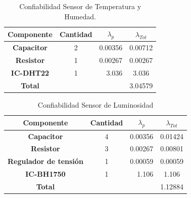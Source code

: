 \begin{table}[H]
\centering
\begin{tabular}{|c|crc|}
\hline
\textbf{Componente} & \multicolumn{1}{c|}{\textbf{Cantidad}} & \multicolumn{1}{c|}{\textbf{$\lambda_p$}}            & \textbf{$\lambda_{Tot}$}   \\ \hline
\textbf{Capacitor}  & \multicolumn{1}{c|}{2}                 & \multicolumn{1}{r|}{0.00356}                         & 0.00712                      \\ \hline
\textbf{Resistor}   & \multicolumn{1}{c|}{1}                 & \multicolumn{1}{r|}{\cellcolor[HTML]{FFFFFF}0.00267} & 0.00267                      \\ \hline
\textbf{IC-DHT22}   & \multicolumn{1}{c|}{1}                 & \multicolumn{1}{r|}{\cellcolor[HTML]{FFFFFF}3.036}   & 3.036                        \\ \hline
\textbf{Total}      & \multicolumn{1}{l}{}                   & \multicolumn{1}{l}{}                                 & \multicolumn{1}{r|}{3.04579} \\ \hline
\end{tabular}
\caption{Confiabilidad Sensor de Temperatura y Humedad.}
\label{tab:conftemphum}
\end{table}
\begin{table}[H]
\centering
\begin{tabular}{|c|crc|}
\hline
\textbf{Componente}           & \multicolumn{1}{c|}{\textbf{Cantidad}} & \multicolumn{1}{c|}{\textbf{$\lambda_p$}}            & \textbf{$\lambda_{Tot}$}   \\ \hline
\textbf{Capacitor}            & \multicolumn{1}{c|}{4}                 & \multicolumn{1}{r|}{0.00356}                         & 0.01424                      \\ \hline
\textbf{Resistor}             & \multicolumn{1}{c|}{3}                 & \multicolumn{1}{r|}{\cellcolor[HTML]{FFFFFF}0.00267} & 0.00801                      \\ \hline
\textbf{Regulador de tensión} & \multicolumn{1}{c|}{1}                 & \multicolumn{1}{r|}{\cellcolor[HTML]{FFFFFF}0.00059} & 0.00059                      \\ \hline
\textbf{IC-BH1750}            & \multicolumn{1}{c|}{1}                 & \multicolumn{1}{r|}{1.106}                           & 1.106                        \\ \hline
\textbf{Total}                & \multicolumn{1}{l}{}                   & \multicolumn{1}{l}{}                                 & \multicolumn{1}{r|}{1.12884} \\ \hline
\end{tabular}
\caption{Confiabilidad Sensor de Luminosidad}
\label{tab:conflum}
\end{table}
%
